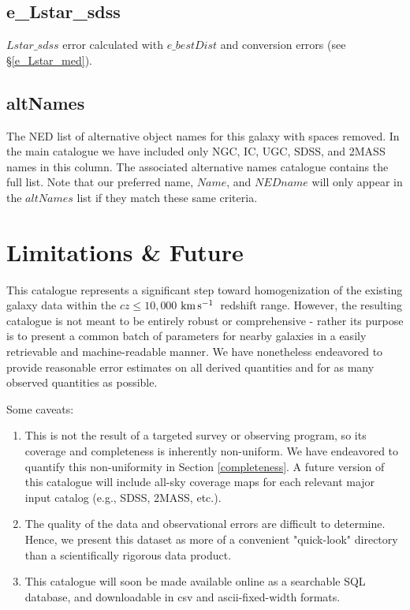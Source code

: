 \documentclass[twocolumn,tighten]{aastex62}
\newcommand{\kms}{$\rm km\, s^{-1}$}
\begin{document}
\subsection{e\_Lstar\_sdss}
$Lstar\_sdss$ error calculated with $e\_bestDist$ and \cite{jester2005} conversion errors (see \S \ref{e_Lstar_med}).


\subsection{altNames}
The NED list of alternative object names for this galaxy with spaces removed. In the main catalogue we have included only NGC, IC, UGC, SDSS, and 2MASS names in this column. The associated alternative names catalogue contains the full list. Note that our preferred name, $Name$, and $NEDname$ will only appear in the $altNames$ list if they match these same criteria.\\


\section{Limitations \& Future}
This catalogue represents a significant step toward homogenization of the existing galaxy data within the $cz \leq 10,000$ \kms~redshift range. However, the resulting catalogue is not meant to be entirely robust or comprehensive - rather its purpose is to present a common batch of parameters for nearby galaxies in a easily retrievable and machine-readable manner. We have nonetheless endeavored to provide reasonable error estimates on all derived quantities and for as many observed quantities as possible.

Some caveats:

\begin{enumerate}

\item{This is not the result of a targeted survey or observing program, so its coverage and completeness is inherently non-uniform. We have endeavored to quantify this non-uniformity in Section \ref{completeness}. A future version of this catalogue will include all-sky coverage maps for each relevant major input catalog (e.g., SDSS, 2MASS, etc.).}

\item{The quality of the data and observational errors are difficult to determine. Hence, we present this dataset as more of a convenient "quick-look" directory than a scientifically rigorous data product.}

\item{This catalogue will soon be made available online as a searchable SQL database, and downloadable in csv and ascii-fixed-width formats.}
\end{enumerate}
\end{document}
